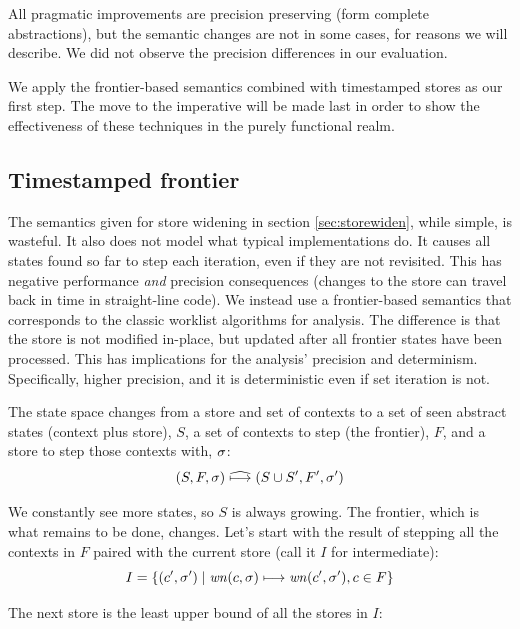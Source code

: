 \documentclass[preprint,onecolumn,9pt]{sigplanconf} %
\begin{document}
All pragmatic improvements are precision preserving (form complete
abstractions), but the semantic changes are not in some cases, for reasons we
will describe. We did not observe the precision differences in our evaluation.

We apply the frontier-based semantics combined with timestamped stores
as our first step.  The move to the imperative will be made last in
order to show the effectiveness of these techniques in the purely
functional realm.

\subsection{Timestamped frontier}

The semantics given for store widening in section \ref{sec:storewiden},
while simple, is wasteful. It also does not model what typical
implementations do. It causes all states found so far to step each
iteration, even if they are not revisited. This has negative
performance \emph{and} precision consequences (changes to the store
can travel back in time in straight-line code). We instead use a
frontier-based semantics that corresponds to the classic worklist
algorithms for analysis. The difference is that the store is not
modified in-place, but updated after all frontier states have been
processed. This has implications for the analysis' precision and
determinism. Specifically, higher precision, and it is deterministic
even if set iteration is not.

The state space changes from a store and set of contexts to a set
of seen abstract states (context plus store), $S$, a set of contexts to
step (the frontier), $F$, and a store to step those contexts with, $\sigma$:
\begin{equation*}
(S, F, \sigma) \mathrel{\widehat{\mathbin{\longmapsto}}} (S \cup S', F', \sigma')
\end{equation*}

We constantly see more states, so $S$ is always growing. The frontier,
which is what remains to be done, changes. Let's start with the result
of stepping all the contexts in $F$ paired with the current store (call it $I$ for intermediate):
%
\begin{equation*}
I = \{(c',\sigma') \mid \mathit{wn}(c, \sigma) \mathrel{\mathbin{\longmapsto}} \mathit{wn}(c', \sigma'), c \in F\}
\end{equation*}

The next store is the least upper bound of all the stores in $I$:
\end{document}
